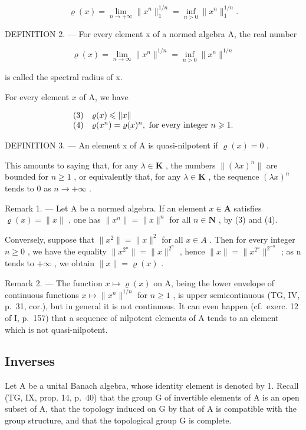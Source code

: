 \[
\varrho (x) = \lim _ {n \to + \infty} \| x ^ {n} \| _ {1} ^ {1 / n} = \inf _ {n > 0} \| x ^ {n} \| _ {1} ^ {1 / n}.
\]

DEFINITION 2. --- For every element x of a normed algebra A, the real number

\[
\varrho (x) = \lim _ {n \to \infty} \| x ^ {n} \| ^ {1 / n} = \inf _ {n > 0} \| x ^ {n} \| ^ {1 / n}
\]

is called the spectral radius of x.

For every element \(x\) of A, we have

\[
\begin{array}{r l} (3) & \varrho (x) \leqslant \| x \| \\ (4) & \varrho (x ^ {n}) = \varrho (x) ^ {n}, \text { for every integer } n \geqslant 1. \end{array}
\]

DEFINITION 3. --- An element x of A is quasi-nilpotent if \(\varrho(x)=0\) .

This amounts to saying that, for any \(\lambda \in \mathbf{K}\) , the numbers \(\| (\lambda x)^n\|\) are bounded for \(n\geqslant 1\) , or equivalently that, for any \(\lambda \in \mathbf{K}\) , the sequence \((\lambda x)^n\) tends to 0 as \(n\to +\infty\) .

Remark 1. --- Let A be a normed algebra. If an element \(x \in \mathbf{A}\) satisfies \(\varrho(x) = \|x\|\) , one has \(\|x^n\| = \|x\|^n\) for all \(n \in \mathbf{N}\) , by (3) and (4).

Conversely, suppose that \(\|x^{2}\|=\|x\|^{2}\) for all \(x\in A\) . Then for every integer \(n\geqslant0\) , we have the equality \(\|x^{2^{n}}\|=\|x\|^{2^{n}}\) , hence \(\|x\|=\|x^{2^{n}}\|^{2^{-n}}\) ; as n tends to \(+\infty\) , we obtain \(\|x\|=\varrho(x)\) .

Remark 2. --- The function \(x \mapsto \varrho(x)\) on A, being the lower envelope of continuous functions \(x \mapsto \|x^n\|^{1/n}\) for \(n \geqslant 1\) , is upper semicontinuous (TG, IV, p.~31, cor.), but in general it is not continuous. It can even happen (cf.~exerc. 12 of I, p.~157) that a sequence of nilpotent elements of A tends to an element which is not quasi-nilpotent.

\subsection{Inverses}

Let A be a unital Banach algebra, whose identity element is denoted by 1. Recall (TG, IX, prop. 14, p.~40) that the group G of invertible elements of A is an open subset of A, that the topology induced on G by that of A is compatible with the group structure, and that the topological group G is complete.

